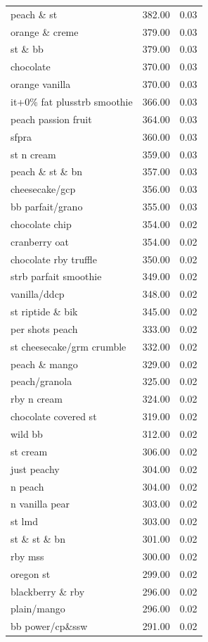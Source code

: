 \begin{table}
\begin{tabular}{lrr}
peach \& st & 382.00 & 0.03 \\
orange \& creme & 379.00 & 0.03 \\
st \& bb & 379.00 & 0.03 \\
chocolate & 370.00 & 0.03 \\
orange vanilla & 370.00 & 0.03 \\
it+0\% fat plusstrb smoothie & 366.00 & 0.03 \\
peach passion fruit & 364.00 & 0.03 \\
sfpra & 360.00 & 0.03 \\
st n cream & 359.00 & 0.03 \\
peach \& st \& bn & 357.00 & 0.03 \\
cheesecake/gcp & 356.00 & 0.03 \\
bb parfait/grano & 355.00 & 0.03 \\
chocolate chip & 354.00 & 0.02 \\
cranberry oat & 354.00 & 0.02 \\
chocolate rby truffle & 350.00 & 0.02 \\
strb parfait smoothie & 349.00 & 0.02 \\
vanilla/ddcp & 348.00 & 0.02 \\
st riptide \& bik & 345.00 & 0.02 \\
per shots peach & 333.00 & 0.02 \\
st cheesecake/grm crumble & 332.00 & 0.02 \\
peach \& mango & 329.00 & 0.02 \\
peach/granola & 325.00 & 0.02 \\
rby n cream & 324.00 & 0.02 \\
chocolate covered st & 319.00 & 0.02 \\
wild bb & 312.00 & 0.02 \\
st cream & 306.00 & 0.02 \\
just peachy & 304.00 & 0.02 \\
n peach & 304.00 & 0.02 \\
n vanilla pear & 303.00 & 0.02 \\
st lmd & 303.00 & 0.02 \\
st \& st \& bn & 301.00 & 0.02 \\
rby mss & 300.00 & 0.02 \\
oregon st & 299.00 & 0.02 \\
blackberry \& rby & 296.00 & 0.02 \\
plain/mango & 296.00 & 0.02 \\
bb power/cp\&ssw & 291.00 & 0.02 \\

\end{tabular}
\end{table}
